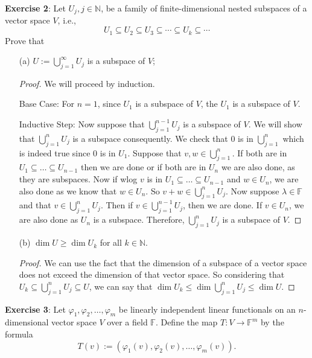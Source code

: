 \documentclass{article}
\begin{document}
\textbf{Exercise 2}: Let $U_{j}, j \in \mathbb{N}$, be a family of finite-dimensional nested subspaces of a vector space $V$, i.e., 
\begin{equation*}
	U_{1} \subseteq U_{2} \subseteq U_{3} \subseteq \cdots \subseteq U_{k} \subseteq \cdots
\end{equation*}
Prove that 
\begin{enumerate}
	\item [(a)] $U := \bigcup_{j = 1}^{\infty}U_{j}$ is a subspace of $V$;
		\begin{proof}
			We will proceed by induction.

			Base Case: For $n = 1$, since $U_{1}$ is a subspace of $V$, the $U_{1}$ is a subspace of $V$. 

			Inductive Step: Now suppose that $\bigcup_{j = 1}^{n - 1}U_{j}$ is a subspace of $V$. We will show that $\bigcup_{j = 1}^{n}U_{j}$ is a subspace consequently. We check that $0$ is in $\bigcup_{j = 1}^{n}$ which is indeed true since $0$ is in $U_{1}$. Suppose that $v, w \in \bigcup_{j = 1}^{n}$. If both are in $U_{1} \subseteq \ldots \subseteq U_{n - 1}$ then we are done or if both are in $U_{n}$ we are also done, as they are subspaces. Now if wlog $v$ is in $U_{1} \subseteq \ldots \subseteq U_{n-1}$ and $w \in U_{n}$, we are also done as we know that $w \in U_{n}$. So $v + w \in \bigcup_{j = 1}^{n}U_{j}$. Now suppose $\lambda \in \mathbb{F}$ and that $v \in \bigcup_{j = 1}^{n}U_{j}$. Then if $v \in \bigcup_{j = 1}^{n - 1}U_{j}$, then we are done. If $v \in U_{n}$, we are also done as $U_{n}$ is a subspace. Therefore, $\bigcup_{j = 1}^{n}U_{j}$ is a subspace of $V$.
		\end{proof}

	\item [(b)] $\dim{U} \geq \dim{U_{k}}$ for all $k \in \mathbb{N}$.
		\begin{proof}
		We can use the fact that the dimension of a subspace of a vector space does not exceed the dimension of that vector space. So considering that $U_{k} \subseteq \bigcup_{j = 1}^{n}U_{j} \subseteq U$, we can say that $\dim{U_{k}} \leq \dim{\bigcup_{j = 1}^{n}U_{j}} \leq \dim{U}$.
		\end{proof}
\end{enumerate}
\textbf{Exercise 3}: Let $\varphi_{1}, \varphi_{2}, \ldots, \varphi_{m}$ be linearly independent linear functionals on an $n$-dimensional vector space $V$ over a field $\mathbb{F}$. Define the map $T : V \rightarrow \mathbb{F}^{m}$ by the formula
\begin{equation*}
	T(v) := (\varphi_{1}(v), \varphi_{2}(v), \ldots, \varphi_{m}(v)).
\end{equation*}
\end{document}

